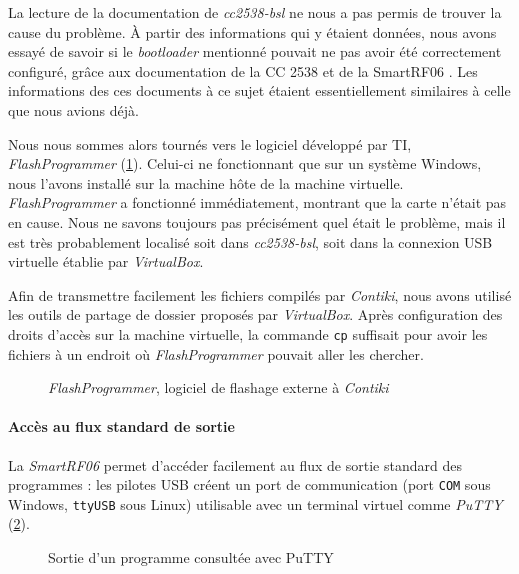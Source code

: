 La lecture de la documentation de \emph{cc2538-bsl}  ne nous a pas permis de trouver la cause du problème.
À partir des informations qui y étaient données, nous avons essayé de savoir si le \textit{bootloader} mentionné pouvait ne pas avoir été correctement configuré, grâce aux documentation de la CC 2538 \cite{cc2538-user-guide} et de la SmartRF06 \cite{smartrf06-user-guide}.
Les informations des ces documents à ce sujet étaient essentiellement similaires à celle que nous avions déjà.

Nous nous sommes alors tournés vers le logiciel développé par TI, \emph{FlashProgrammer} (\cref{flashprogrammer}).
Celui-ci ne fonctionnant que sur un système Windows, nous l’avons installé sur la machine hôte de la machine virtuelle.
\emph{FlashProgrammer} a fonctionné immédiatement, montrant que la carte n’était pas en cause.
Nous ne savons toujours pas précisément quel était le problème, mais il est très probablement localisé soit dans \emph{cc2538-bsl}, soit dans la connexion USB virtuelle établie par \emph{VirtualBox}.

Afin de transmettre facilement les fichiers compilés par \emph{Contiki}, nous avons utilisé les outils de partage de dossier proposés par \emph{VirtualBox}.
Après configuration des droits d’accès sur la machine virtuelle, la commande \texttt{cp} suffisait pour avoir les fichiers à un endroit où \emph{FlashProgrammer} pouvait aller les chercher.

\begin{figure}[H]
\centering
{}
\caption{\emph{FlashProgrammer}, logiciel de flashage externe à \emph{Contiki}}
\label{flashprogrammer}
\end{figure}

\paragraph{Accès au flux standard de sortie}

La \emph{SmartRF06} permet d’accéder facilement au flux de sortie standard des programmes : les pilotes USB créent un port de communication (port \texttt{COM} sous Windows, \texttt{ttyUSB} sous Linux) utilisable avec un terminal virtuel comme \emph{PuTTY} (\cref{putty}).

\begin{figure}[H]
\centering
{}
\caption{Sortie d’un programme consultée avec \emph{}PuTTY}
\label{putty}
\end{figure}

